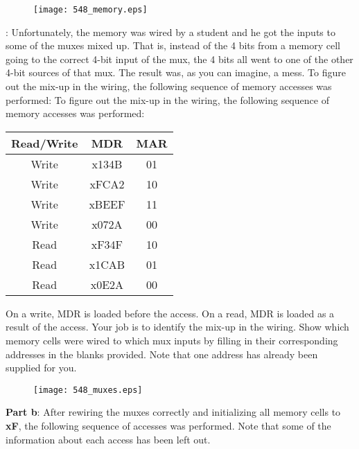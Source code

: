 \documentclass{patt}
\begin{document}
\begin{exercises}
\hspace{1.0in}
\begin{figure}[h]
\centering
\texttt{[image: 548\_memory.eps]}
\end{figure}

: Unfortunately, the memory was wired by a student and 
he got the inputs to some of the muxes mixed up.  That is,
instead of the 4 bits from a memory cell going to the correct 4-bit input of
the mux, the 4 bits all went to one of the other 4-bit sources of that mux.
The result was, as you can imagine, a mess. To figure out the mix-up in the wiring, the following sequence of memory
accesses was performed:
\noindent 
To figure out the mix-up in the wiring, the following sequence of memory
accesses was performed:
\begin{center}
\setlength{\extrarowheight}{7.0pt}
\begin{tabular}[t]{c|c|c}
Read/Write & MDR & MAR \\
\hline
Write & x134B & 01 \\
\hline
Write & xFCA2 & 10 \\
\hline
Write & xBEEF & 11 \\
\hline
Write & x072A & 00 \\
\hline
Read & xF34F & 10 \\
\hline
Read & x1CAB & 01 \\
\hline
Read & x0E2A & 00 \\
\end{tabular}
\end{center}

\vspace{0.15in}
 On a write, MDR is loaded before the access.
On a read, MDR is loaded as a result of the access.
\noindent
Your job is to identify the mix-up in the wiring.  Show which memory cells
were wired to which mux inputs by filling in their corresponding addresses in
the blanks provided.  Note that one address has already been supplied for you.


\begin{figure}[h]
\centering
\texttt{[image: 548\_muxes.eps]}
\end{figure}

\vspace{.2in}

\noindent
{\bf Part b}: After rewiring the muxes correctly and initializing all memory
cells to {\bf xF}, the following sequence of accesses was performed.  Note that
some of the information about each access has been left out.\\


\end{exercises}
\end{document}
